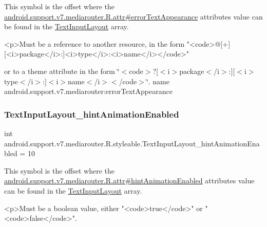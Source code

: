 This symbol is the offset where the \hyperlink{classandroid_1_1support_1_1v7_1_1mediarouter_1_1R_1_1attr_a5c73f4d61559470e6b21c11c6d850bc4}{android.\+support.\+v7.\+mediarouter.\+R.\+attr\#error\+Text\+Appearance} attribute\textquotesingle{}s value can be found in the \hyperlink{classandroid_1_1support_1_1v7_1_1mediarouter_1_1R_1_1styleable_a935a5feb3f0394eb1c07f26b207dfb2d}{Text\+Input\+Layout} array.

\begin{DoxyVerb}      <p>Must be a reference to another resource, in the form "<code>@[+][<i>package</i>:]<i>type</i>:<i>name</i></code>"
\end{DoxyVerb}
 or to a theme attribute in the form \char`\"{}$<$code$>$?\mbox{[}$<$i$>$package$<$/i$>$\+:\mbox{]}\mbox{[}$<$i$>$type$<$/i$>$\+:\mbox{]}$<$i$>$name$<$/i$>$$<$/code$>$\char`\"{}.  name android.\+support.\+v7.\+mediarouter\+:error\+Text\+Appearance \mbox{\label{classandroid_1_1support_1_1v7_1_1mediarouter_1_1R_1_1styleable_ac0c7f954fdab6a754ad01fdbc4aeb6ca}} 
\subsubsection{\texorpdfstring{Text\+Input\+Layout\+\_\+hint\+Animation\+Enabled}{TextInputLayout\_hintAnimationEnabled}}
{\footnotesize\ttfamily int android.\+support.\+v7.\+mediarouter.\+R.\+styleable.\+Text\+Input\+Layout\+\_\+hint\+Animation\+Enabled = 10\hspace{0.3cm}{\ttfamily [static]}}

This symbol is the offset where the \hyperlink{classandroid_1_1support_1_1v7_1_1mediarouter_1_1R_1_1attr_a379b98c861daa2964b42107fb3a190fd}{android.\+support.\+v7.\+mediarouter.\+R.\+attr\#hint\+Animation\+Enabled} attribute\textquotesingle{}s value can be found in the \hyperlink{classandroid_1_1support_1_1v7_1_1mediarouter_1_1R_1_1styleable_a935a5feb3f0394eb1c07f26b207dfb2d}{Text\+Input\+Layout} array.

\begin{DoxyVerb}      <p>Must be a boolean value, either "<code>true</code>" or "<code>false</code>".
\end{DoxyVerb}
 

